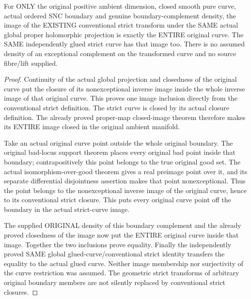 \begin{theorem}
\label{hir:sharp-actual-original-global-strict-image-equality}
\leanok
For ONLY the original positive ambient dimension, closed smooth pure
curve, actual ordered SNC boundary and genuine boundary-complement
density, the image of the EXISTING conventional strict transform under
the SAME actual global proper holomorphic projection is exactly the
ENTIRE original curve. The SAME independently glued strict curve has
that image too. There is no assumed density of an exceptional complement
on the transformed curve and no source fibre/lift supplied.
\end{theorem}
\begin{proof}
Continuity of the actual global projection and closedness of the
original curve put the closure of its nonexceptional inverse image
inside the whole inverse image of that original curve. This proves
one image inclusion directly from the conventional strict definition.
The strict curve is closed by its actual closure definition. The
already proved proper-map closed-image theorem therefore makes its
ENTIRE image closed in the original ambient manifold.

Take an actual original curve point outside the whole original boundary.
The original bad-locus support theorem places every original bad point
inside that boundary; contrapositively this point belongs to the true
original good set. The actual isomorphism-over-good theorem gives a real
preimage point over it, and its separate differential disjointness
assertion makes that point nonexceptional. Thus the point belongs to
the nonexceptional inverse image of the original curve, hence to its
conventional strict closure. This puts every original curve point off
the boundary in the actual strict-curve image.

The supplied ORIGINAL density of this boundary complement and the
already proved closedness of the image now put the ENTIRE original
curve inside that image. Together the two inclusions prove equality.
Finally the independently proved SAME global glued-curve/conventional
strict identity transfers the equality to the actual glued curve.
Neither image membership nor surjectivity of the curve restriction was
assumed. The geometric strict transforms of arbitrary original boundary
members are not silently replaced by conventional strict closures.
\end{proof}
